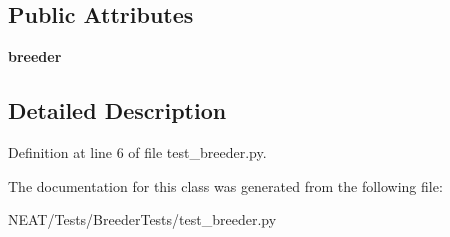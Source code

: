 \subsection*{Public Attributes}
\begin{DoxyCompactItemize}
\item 
{\bfseries breeder}\hypertarget{class_n_e_a_t___py_genetics_1_1_n_e_a_t_1_1_tests_1_1_breeder_tests_1_1test__breeder_1_1_test_breeder_abc027b8c1ce451c04c5eae1fe983c40b}{}\label{class_n_e_a_t___py_genetics_1_1_n_e_a_t_1_1_tests_1_1_breeder_tests_1_1test__breeder_1_1_test_breeder_abc027b8c1ce451c04c5eae1fe983c40b}

\end{DoxyCompactItemize}


\subsection{Detailed Description}


Definition at line 6 of file test\+\_\+breeder.\+py.



The documentation for this class was generated from the following file\+:\begin{DoxyCompactItemize}
\item 
N\+E\+A\+T/\+Tests/\+Breeder\+Tests/test\+\_\+breeder.\+py\end{DoxyCompactItemize}

